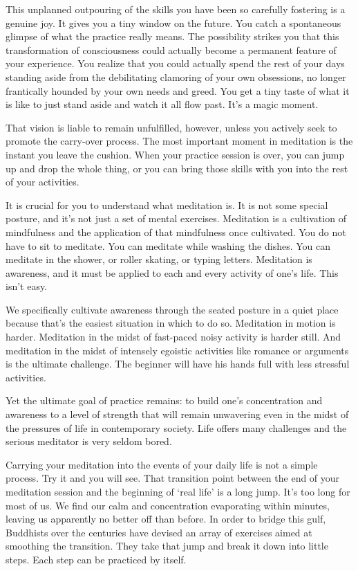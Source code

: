 This unplanned outpouring of the skills you have been so carefully fostering is
a genuine joy. It gives you a tiny window on the future. You catch a spontaneous
glimpse of what the practice really means. The possibility strikes you that this
transformation of consciousness could actually become a permanent feature of
your experience. You realize that you could actually spend the rest of your days
standing aside from the debilitating clamoring of your own obsessions, no longer
frantically hounded by your own needs and greed. You get a tiny taste of what it
is like to just stand aside and watch it all flow past. It's a magic moment.

That vision is liable to remain unfulfilled, however, unless you actively seek
to promote the carry-over process. The most important moment in meditation is
the instant you leave the cushion. When your practice session is over, you can
jump up and drop the whole thing, or you can bring those skills with you into
the rest of your activities.

It is crucial for you to understand what meditation is. It is not some special
posture, and it's not just a set of mental exercises.  Meditation is a
cultivation of mindfulness and the application of that mindfulness once
cultivated. You do not have to sit to meditate. You can meditate while washing
the dishes. You can meditate in the shower, or roller skating, or typing
letters.  Meditation is awareness, and it must be applied to each and every
activity of one's life. This isn't easy.

We specifically cultivate awareness through the seated posture in a quiet place
because that's the easiest situation in which to do so. Meditation in motion is
harder. Meditation in the midst of fast-paced noisy activity is harder still.
And meditation in the midst of intensely egoistic activities like romance or
arguments is the ultimate challenge. The beginner will have his hands full with
less stressful activities.

Yet the ultimate goal of practice remains: to build one's concentration and
awareness to a level of strength that will remain unwavering even in the midst
of the pressures of life in contemporary society. Life offers many challenges
and the serious meditator is very seldom bored.

Carrying your meditation into the events of your daily life is not a simple
process. Try it and you will see. That transition point between the end of your
meditation session and the beginning of `real life' is a long jump. It's too
long for most of us. We find our calm and concentration evaporating within
minutes, leaving us apparently no better off than before. In order to bridge
this gulf, Buddhists over the centuries have devised an array of exercises aimed
at smoothing the transition. They take that jump and break it down into little
steps. Each step can be practiced by itself.

